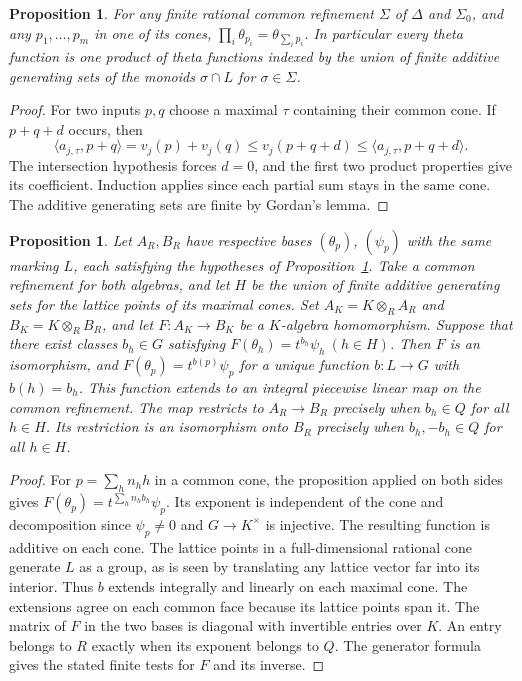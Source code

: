 \documentclass[11pt,reqno]{amsart}
\numberwithin{equation}{section}
\newtheorem{proposition}[theorem]{Proposition}
\theoremstyle{definition}
\theoremstyle{remark}
\begin{document}
\begin{proposition}\label{prop:prescribed-hilbert-products}
For any finite rational common refinement \(\Sigma\) of \(\Delta\)
and \(\Sigma_0\), and any \(p_1,\ldots,p_m\) in one of its cones,
\(\prod_i\theta_{p_i}=\theta_{\sum_i p_i}\). In particular every
theta function is one product of theta functions indexed by the union
of finite additive generating sets of the monoids \(\sigma\cap L\)
for \(\sigma\in\Sigma\).
\end{proposition}
\begin{proof}
For two inputs \(p,q\) choose a maximal \(\tau\) containing their
common cone. If \(p+q+d\) occurs, then
\[ \langle a_{j,\tau},p+q\rangle =v_j(p)+v_j(q)\le v_j(p+q+d) \le\langle a_{j,\tau},p+q+d\rangle . \]
The intersection hypothesis forces \(d=0\), and the first two product
properties give its coefficient. Induction applies since each partial
sum stays in the same cone. The additive generating sets are finite by
Gordan's lemma.
\end{proof}

\begin{proposition}\label{prop:prescribed-finite-comparison}
Let \(A_R,B_R\) have respective bases \((\theta_p)\), \((\psi_p)\)
with the same marking \(L\), each satisfying the hypotheses of
Proposition~\ref{prop:prescribed-hilbert-products}. Take a common
refinement for both algebras, and let \(H\) be the union of finite
additive generating sets for the lattice points of its maximal cones.
Set \(A_K=K\otimes_R A_R\) and \(B_K=K\otimes_R B_R\), and let
\(F:A_K\to B_K\) be a \(K\)-algebra homomorphism. Suppose that
there exist classes \(b_h\in G\) satisfying
\(F(\theta_h)=t^{b_h}\psi_h\ (h\in H)\).
Then \(F\) is an isomorphism, and \(F(\theta_p)=t^{b(p)}\psi_p\)
for a unique function \(b:L\to G\) with \(b(h)=b_h\). This function
extends to an integral piecewise linear map on the common refinement.
The map restricts to \(A_R\to B_R\) precisely when \(b_h\in Q\)
for all \(h\in H\). Its restriction is an isomorphism onto \(B_R\)
precisely when \(b_h,-b_h\in Q\) for all \(h\in H\).
\end{proposition}
\begin{proof}
For \(p=\sum_h n_hh\) in a common cone, the proposition applied on
both sides gives
\(F(\theta_p)=t^{\sum_h n_h b_h}\psi_p\).
Its exponent is independent of the cone and decomposition since
\(\psi_p\ne0\) and \(G\to K^\times\) is injective. The resulting
function is additive on each cone. The lattice points in a
full-dimensional rational cone generate \(L\) as a group, as is seen
by translating any lattice vector far into its interior. Thus \(b\)
extends integrally and linearly on each maximal cone. The extensions
agree on each common face because its lattice points span it. The
matrix of \(F\) in the two bases is diagonal with invertible entries
over \(K\). An entry belongs to \(R\) exactly when its exponent
belongs to \(Q\). The generator formula gives the stated finite tests
for \(F\) and its inverse.
\end{proof}
\end{document}
